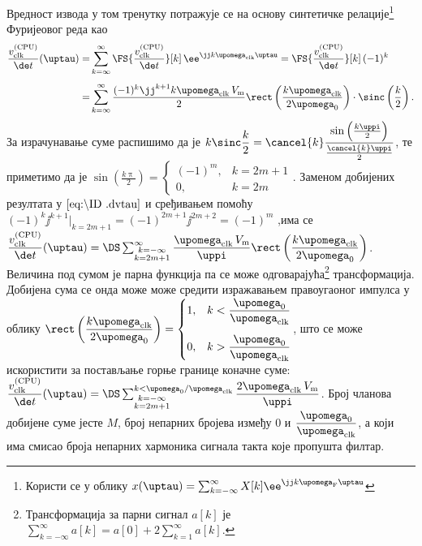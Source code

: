     Вредност извода у том тренутку потражује се на основу синтетичке релације\footnote{
    Користи се у облику $x(\uptau) = \sum_{k = -\infty}^{\infty} X[k] \ee^{\jj k\upomega_{\rm F} \uptau}$
    } Фуријеовог реда као 
    \begin{align}
        \dfrac{v_{\rm clk}^{\rm (CPU)}}{\de t}  (\uptau)
        =& 
        \sum_{k = \infty}^{\infty} 
        \FS{ \dfrac{v_{\rm clk}^{\rm (CPU)}}{\de t} }[k] \, \ee^{\jj k \upomega_{\rm clk} \uptau} 
        = 
        \FS{ \dfrac{v_{\rm clk}^{\rm (CPU)}}{\de t} }[k] \, (-1)^k \\[1.5mm]
        =&
        \sum_{k = \infty}^{\infty} 
        \dfrac{ 
        (-1)^k \jj^{k+1} k \upomega_{\rm clk} \, 
        V_{\rm m} }{2}
        \rect \left( \dfrac{k{\upomega_{\rm clk}}}{2\upomega_0} \right) 
        \cdot
        \sinc \left(
        \dfrac{k}{2} \right). \label{eq:\ID.dvtau}
    \end{align}
    За израчунавање суме распишимо да је 
    $k \sinc\dfrac{k}{2} = 
    \cancel{k} \dfrac{\sin\left( \frac{k\uppi}{2} \right) }{ \frac{\cancel{k}\uppi}{2} }
    $, те приметимо да је \linebreak
    ${\sin\left( \frac{k\uppi}{2} \right) = 
    \begin{cases}
        (-1)^m ,&  k = 2m+1 \\
        0      ,& k = 2m
    \end{cases}}$. Заменом добијених резултата  
    у $\eqref{eq:\ID.dvtau}$ и сређивањем помоћу 
    $ (-1)^k \jj^{k+1} \bigg|_{k = 2m+1} = 
    (-1)^{2m + 1} \jj^{2m + 2} = (-1)^m
    $
    ,има се 
    $
        \dfrac{v_{\rm clk}^{\rm (CPU)}}{\de t}  (\uptau)
        = \DS
        \sum_{\substack{ k = -\infty \\ k = 2m + 1 } }^{\infty} 
        \dfrac{ 
        \upomega_{\rm clk} \, 
        V_{\rm m} }{\uppi}
        \rect \left( \dfrac{{k \upomega_{\rm clk}}}{2\upomega_0} \right)  
    $. Величина под сумом је парна функција па се може одговарајућа\footnote{
        Трансформација за парни сигнал $a[k]$ је 
        $\sum_{k = -\infty}^{\infty} a[k] = a[0] + 2\sum_{k = 1}^{\infty} a[k]$.
    }
    трансформација. Добијена сума се онда може
    може средити изражавањем правоугаоног импулса у облику
    $
        \rect \left( \dfrac{{k \upomega_{\rm clk}}}{2\upomega_0} \right)
        =
        \begin{cases}
            1,& k < \dfrac{\upomega_{\rm 0}}{\upomega_{\rm clk}} \\[5mm]
            0,& k > \dfrac{\upomega_{\rm 0}}{\upomega_{\rm clk}} 
        \end{cases}
    $, што се може искористити за постављање горње границе коначне суме:
    $
        \dfrac{v_{\rm clk}^{\rm (CPU)}}{\de t}  (\uptau)
        = \DS
        \sum_{\substack{ k = -\infty \\ k = 2m + 1 } }^{k < \upomega_0 / \upomega_{\rm clk} } 
        \dfrac{ 2
        \upomega_{\rm clk} \, 
        V_{\rm m} }{\uppi} 
    $. Број чланова добијене суме јесте $M$, број непарних бројева између $0$ и 
    $\dfrac{\upomega_0}{\upomega_{\rm clk}}$, а који има смисао   
    броја непарних хармоника сигнала такта које пропушта филтар.  
    \\[2mm]
    

